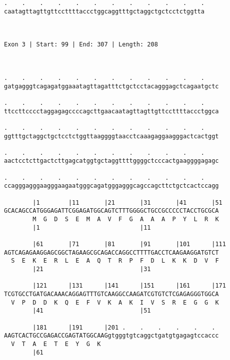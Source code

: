 \documentclass{article}
\begin{document}
\begin{Verbatim}
.    .    .    .    .    .    .    .    .    .    .    .
caatagttagttgttccttttaccctggcaggtttgctaggctgctcctctggtta
                                                        
                                                        
 
Exon 3 | Start: 99 | End: 307 | Length: 208



.    .    .    .    .    .    .    .    .    .    .    .    
gatgagggtcagagatggaaatagttagatttctgctcctacagggagctcagaatgctc
                                                            
.    .    .    .    .    .    .    .    .    .    .    .    
ttccttcccctaggagagccccagcttgaacaatagttagttgttccttttaccctggca
                                                            
.    .    .    .    .    .    .    .    .    .    .    .    
ggtttgctaggctgctcctctggttaaggggtaacctcaaagaggaagggactcactggt
                                                            
.    .    .    .    .    .    .    .    .    .    .    .    
aactcctcttgactcttgagcatggtgctaggttttggggctcccactgaaggggagagc
                                                            
.    .    .    .    .    .    .    .    .    .    .    .    
ccagggagggaagggaagaatgggcagatgggagggcagccagcttctgctcactccagg
                                                            
        |1        |11       |21       |31       |41       |51
GCACAGCCATGGGAGATTCGGAGATGGCAGTCTTTGGGGCTGCCGCCCCCTACCTGCGCA
        M  G  D  S  E  M  A  V  F  G  A  A  A  P  Y  L  R  K
        |1                            |11                   
  
        |61       |71       |81       |91       |101      |111
AGTCAGAGAAGGAGCGGCTAGAAGCGCAGACCAGGCCTTTTGACCTCAAGAAGGATGTCT
  S  E  K  E  R  L  E  A  Q  T  R  P  F  D  L  K  K  D  V  F
        |21                           |31                   
  
        |121      |131      |141      |151      |161      |171
TCGTGCCTGATGACAAACAGGAGTTTGTCAAGGCCAAGATCGTGTCTCGAGAGGGTGGCA
  V  P  D  D  K  Q  E  F  V  K  A  K  I  V  S  R  E  G  G  K
        |41                           |51                   
  
        |181      |191      |201 .    .    .    .    .    . 
AAGTCACTGCCGAGACCGAGTATGGCAAGgtgggtgtcaggctgatgtgagagtccaccc
  V  T  A  E  T  E  Y  G  K                                 
        |61                                                 
  

\end{Verbatim}
\end{document}
